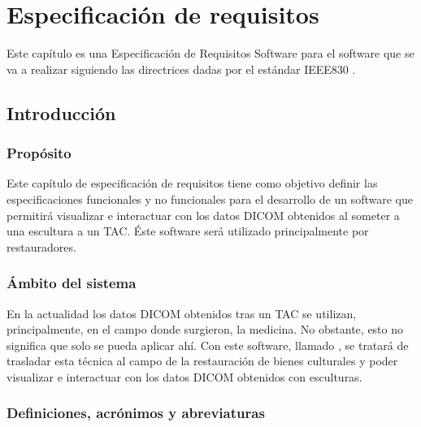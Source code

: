 \chapter{Especificación de requisitos}

Este capítulo es una Especificación de Requisitos Software para el software que se va a realizar siguiendo las directrices dadas por el estándar IEEE830 \cite{iee830}.

\section{Introducción}

	\subsection{Propósito}
	
	Este capítulo de especificación de requisitos tiene como objetivo definir las especificaciones funcionales y no funcionales para el desarrollo de un software que permitirá visualizar e interactuar con los datos DICOM obtenidos al someter a una escultura a un TAC. Éste software será utilizado principalmente por restauradores.
	
	\subsection{Ámbito del sistema}
	
	En la actualidad los datos DICOM obtenidos tras un TAC se utilizan, principalmente, en el campo donde surgieron, la medicina. No obstante, esto no significa que solo se pueda aplicar ahí. Con este software, llamado \myTitle, se tratará de trasladar esta técnica al campo de la restauración de bienes culturales y poder visualizar e interactuar con los datos DICOM obtenidos con esculturas.
	
	\subsection{Definiciones, acrónimos y abreviaturas}
	
